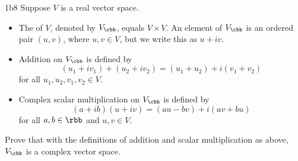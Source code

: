 \begin{exercise}{1b8}
    Suppose $V$ is a real vector space.
    \begin{itemize}
        \item The  of $V$, denoted by $V_{\cbb}$, equals $V \times V$.
	    An element of $V_{\cbb}$ is an ordered pair $(u, v)$, where $u, v \in V$, but we write this as $u + iv$.
        \item Addition on $V_{\cbb}$ is defined by
        \[
        	(u_1 + iv_1) + (u_2 + iv_2) = (u_1 + u_2) + i(v_1 + v_2)
        \]
        for all $u_1, u_2, v_1, v_2 \in V$.
        \item Complex scalar multiplication on $V_{\cbb}$ is defined by
        \[
        	(a + ib)(u + iv) = (au - bv) + i(av + bu)
        \]
        for all $a, b \in \rbb$ and $u, v \in V$.
    \end{itemize}
    Prove that with the definitions of addition and scalar multiplication as above, $V_{\cbb}$ is a complex vector space.

\end{exercise}

